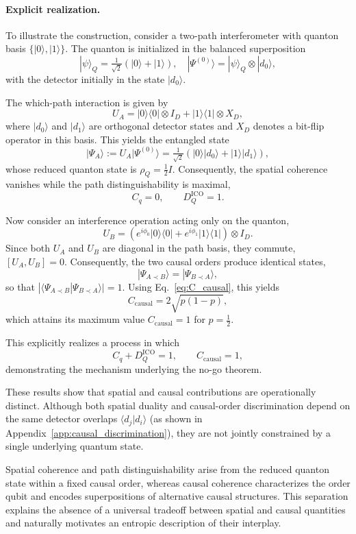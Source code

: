 \documentclass[aps,pra,reprint,superscriptaddress]{revtex4-2}
\begin{document}
\medskip

\paragraph*{Explicit realization.}
To illustrate the construction, consider a two-path interferometer with quanton basis $\{|0\rangle,|1\rangle\}$. The quanton is initialized in the balanced superposition
\[
|\psi\rangle_Q = \tfrac{1}{\sqrt{2}} (|0\rangle + |1\rangle),
\quad
|\Psi^{(0)}\rangle = |\psi\rangle_Q \otimes |d_0\rangle,
\]
with the detector initially in the state $|d_0\rangle$.

The which-path interaction is given by
\[
U_A = |0\rangle\langle0|\otimes I_D + |1\rangle\langle1|\otimes X_D,
\]
where $|d_0\rangle$ and $|d_1\rangle$ are orthogonal detector states and $X_D$ denotes a bit-flip operator in this basis. This yields the entangled state
\[
|\Psi_A\rangle := U_A |\Psi^{(0)}\rangle =
\tfrac{1}{\sqrt{2}} \left(
|0\rangle|d_0\rangle + |1\rangle|d_1\rangle
\right),
\]
whose reduced quanton state is $\rho_Q = \tfrac12 I$. Consequently, the spatial coherence vanishes while the path distinguishability is maximal,
\[
C_q = 0, \qquad D_Q^{\mathrm{ICO}} = 1.
\]

Now consider an interference operation acting only on the quanton,
\[
U_B = \left(e^{i\phi_0}|0\rangle\langle0| + e^{i\phi_1}|1\rangle\langle1|\right) \otimes I_D.
\]
Since both $U_A$ and $U_B$ are diagonal in the path basis, they commute, $[U_A,U_B]=0$. Consequently, the two causal orders produce identical states,
\[
|\Psi_{A\prec B}\rangle = |\Psi_{B\prec A}\rangle,
\]
so that $|\langle \Psi_{A\prec B} | \Psi_{B\prec A} \rangle| = 1$. Using Eq.~\eqref{eq:C_causal}, this yields
\[
C_{\mathrm{causal}} = 2\sqrt{p(1-p)},
\]
which attains its maximum value $C_{\mathrm{causal}}=1$ for $p=\tfrac12$.

This explicitly realizes a process in which
\[
C_q + D_Q^{\mathrm{ICO}} = 1,
\qquad
C_{\mathrm{causal}} = 1,
\]
demonstrating the mechanism underlying the no-go theorem.

\medskip

These results show that spatial and causal contributions are operationally distinct. Although both spatial duality and causal-order discrimination depend on the same detector overlaps $\langle d_j|d_i\rangle$ (as shown in Appendix~\ref{app:causal_discrimination}), they are not jointly constrained by a single underlying quantum state.

Spatial coherence and path distinguishability arise from the reduced quanton state within a fixed causal order, whereas causal coherence characterizes the order qubit and encodes superpositions of alternative causal structures. This separation explains the absence of a universal tradeoff between spatial and causal quantities and naturally motivates an entropic description of their interplay.
\end{document}
